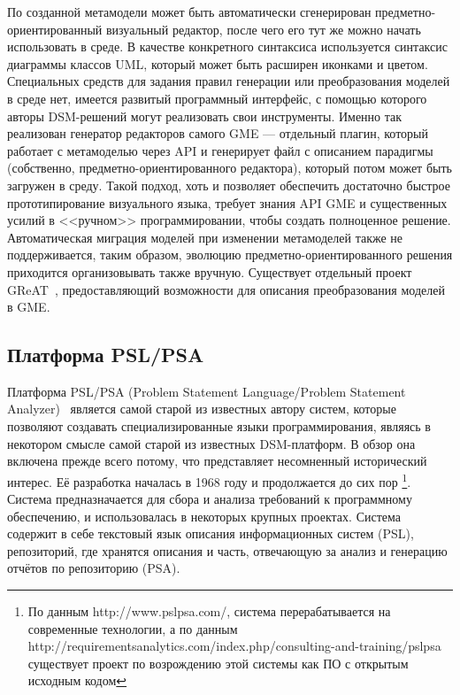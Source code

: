 По созданной метамодели может быть автоматически сгенерирован предметно-ориентированный 
визуальный редактор, после чего его тут же можно начать использовать в среде. В качестве 
конкретного синтаксиса используется синтаксис диаграммы классов UML, который может 
быть расширен иконками и цветом. Специальных средств для задания правил генерации 
или преобразования моделей в среде нет, имеется развитый программный интерфейс, с 
помощью которого авторы \ac{DSM}-решений могут реализовать свои инструменты. Именно так 
реализован генератор редакторов самого GME --- отдельный плагин, который работает с 
метамоделью через \ac{API} и генерирует файл с описанием парадигмы (собственно, предметно-ориентированного 
редактора), который потом может быть загружен в среду. Такой подход, хоть и позволяет 
обеспечить достаточно быстрое прототипирование визуального языка, требует знания \ac{API} GME 
и существенных усилий в <<ручном>> программировании, чтобы создать полноценное решение. 
Автоматическая миграция моделей при изменении метамоделей также не поддерживается, 
таким образом, эволюцию предметно-ориентированного решения приходится организовывать 
также вручную. Существует отдельный проект GReAT~\cite{great}, предоставляющий возможности 
для описания преобразования моделей в GME.

\subsection{Платформа PSL/PSA}
Платформа PSL/PSA (Problem Statement Language/Problem Statement Analyzer)~\cite{teichroew1977psl} 
является самой старой из известных автору систем, которые позволяют создавать специализированные языки программирования, являясь в некотором
смысле самой старой из известных \ac{DSM}-платформ. В обзор она включена прежде всего потому, 
что представляет несомненный исторический интерес. Её разработка началась в 1968 году и продолжается до сих пор%
\footnote{По данным http://www.pslpsa.com/, система перерабатывается на современные технологии,
а по данным http://requirementsanalytics.com/index.php/consulting-and-training/pslpsa 
существует проект по возрождению этой системы как ПО с открытым исходным кодом}. Система 
предназначается для сбора и анализа требований к программному обеспечению, и использовалась в некоторых крупных
проектах. Система содержит в себе текстовый язык описания информационных систем (PSL), репозиторий, 
где хранятся описания и часть, отвечающую за анализ и генерацию отчётов по репозиторию (PSA).

